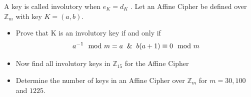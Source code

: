 \documentclass[10pt, a4paper]{article}
\begin{document}
\newpage
\begin{Problem}
    A key is called involutory when $e_K = d_K$ . Let an Affine Cipher be defined over $\mathbb{Z}_m$ with key
    $K = (a, b)$.
    \begin{itemize}
        \item Prove that K is an involutory key if and only if
              \[
                  a^{-1} \mod m = a  \And
                  b(a + 1) \equiv 0 \mod m
              \]
        \item Now find all involutory keys in $\mathbb{Z}_{15}$ for the Affine Cipher
        \item Determine the number of keys in an Affine Cipher over $\mathbb{Z}_m$ for $m = 30, 100$ and $1225$.
    \end{itemize}
\end{Problem}
\end{document}
